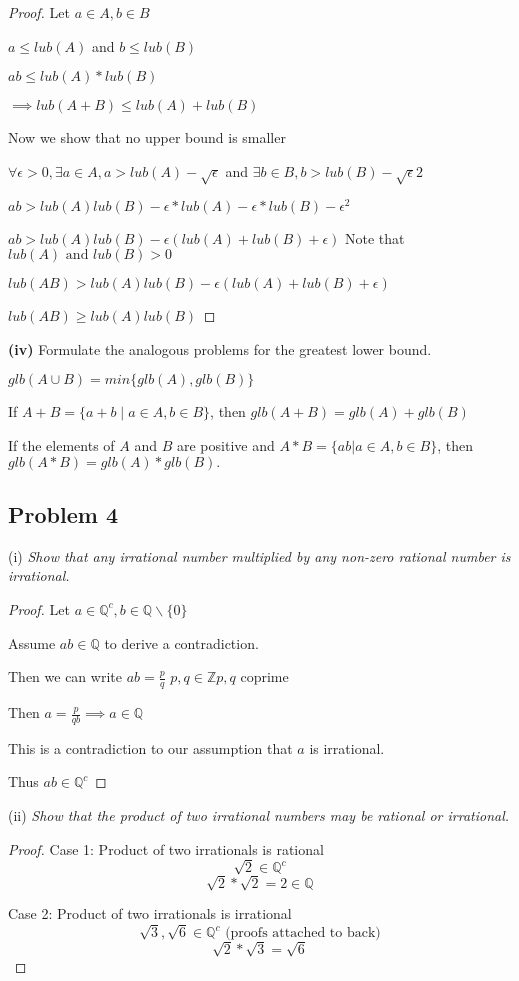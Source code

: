 \documentclass[12pt, a4paper]{article}
\begin{document}
        \begin{proof}
            Let $a\in A, b\in B$ 

            $a\le lub(A)$ and $b\le lub(B)$

            $ab \le lub(A)*lub(B)$
            
            $\implies lub(A+B) \le lub(A)+lub(B)$

            Now we show that no upper bound is smaller

            $\forall \epsilon > 0, \exists a\in A, a > lub(A)-\sqrt{\epsilon}$ and $\exists b\in B, b > lub(B)-\sqrt{\epsilon}{2}$

            $ab > lub(A)lub(B)-\epsilon *lub(A)-\epsilon *lub(B) - \epsilon^2$

            $ab > lub(A)lub(B)-\epsilon(lub(A)+lub(B)+\epsilon)$ Note that $lub(A) \text{ and } lub(B) > 0$

            $lub(AB) > lub(A)lub(B)-\epsilon(lub(A)+lub(B)+\epsilon)$

            $lub(AB) \ge lub(A)lub(B)$

        \end{proof}
    \noindent \textbf{(iv)} Formulate the analogous problems for the greatest lower bound.

            $glb(A \cup B) = min\{glb(A),glb(B)\}$

            If $A + B = \{a + b \mid a \in A, b \in B \}$, then $glb(A + B) = glb(A) + glb(B)$

            If the elements of $A$ and $B$ are positive and $A*B = \{ab | a \in A, b \in B\}$, then $glb(A * B) = glb(A)*glb(B).$
    \subsection*{Problem 4} 
    
    (i) \textit{Show that any irrational number multiplied by any non-zero rational
        number is irrational.}
    \begin{proof}
        Let $ a \in \mathbb{Q}^c, b\in \mathbb{Q}\backslash \{0\}$ 

        Assume $ab \in \mathbb{Q}$ to derive a contradiction. 

        Then we can write $ab = \frac{p}{q}$ $p,q \in \mathbb{Z} p,q $ coprime

        Then $a=\frac{p}{qb} \implies a \in \mathbb{Q}$

        This is a contradiction to our assumption that $a$ is irrational. 

        Thus $ab \in \mathbb{Q}^c$
    \end{proof}
    \noindent(ii) \textit{Show that the product of two irrational numbers may be rational or
        irrational.}
    \begin{proof}

        Case 1: Product of two irrationals is rational
        $$\sqrt{2} \in \mathbb{Q}^c$$ 
        $$\sqrt{2}*\sqrt{2} = 2 \in \mathbb{Q}$$

        Case 2: Product of two irrationals is irrational
        $$\sqrt{3}, \sqrt{6} \in \mathbb{Q}^c \text{ (proofs attached to back)}$$
        $$\sqrt{2}*\sqrt{3}=\sqrt{6}$$
    \end{proof}
\end{document}
